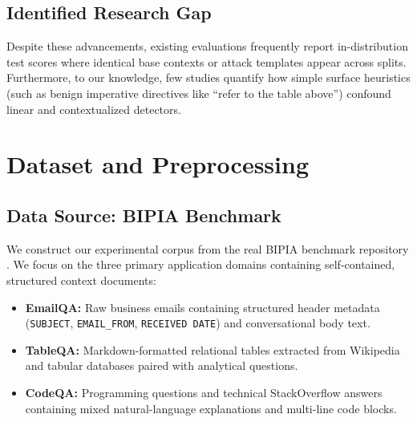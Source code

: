 \documentclass[10pt,conference]{IEEEtran}
\begin{document}
\subsection{Identified Research Gap}
Despite these advancements, existing evaluations frequently report in-distribution test scores where identical base contexts or attack templates appear across splits. Furthermore, to our knowledge, few studies quantify how simple surface heuristics (such as benign imperative directives like ``refer to the table above'') confound linear and contextualized detectors.

\section{Dataset and Preprocessing}

\subsection{Data Source: BIPIA Benchmark}
We construct our experimental corpus from the real BIPIA benchmark repository \cite{yi2025bipia}. We focus on the three primary application domains containing self-contained, structured context documents:
\begin{itemize}
    \item \textbf{EmailQA:} Raw business emails containing structured header metadata (\texttt{SUBJECT}, \texttt{EMAIL\_FROM}, \texttt{RECEIVED DATE}) and conversational body text.
    \item \textbf{TableQA:} Markdown-formatted relational tables extracted from Wikipedia and tabular databases paired with analytical questions.
    \item \textbf{CodeQA:} Programming questions and technical StackOverflow answers containing mixed natural-language explanations and multi-line code blocks.
\end{itemize}
\end{document}
